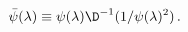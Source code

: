 \begin{equation}\label{eq:2ndSol}
 \bar{\psi}(\lambda) \equiv {\psi}(\lambda)
\D^{-1}(1/{\psi}(\lambda)^2)\,.
\end{equation}

